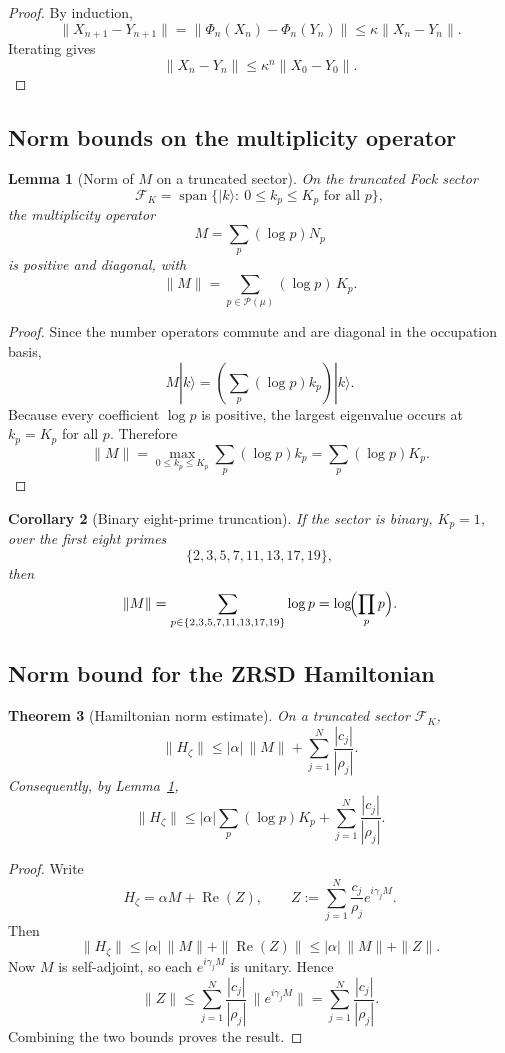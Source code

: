 \documentclass[11pt,a4paper]{article}
\theoremstyle{plain}
\newtheorem{theorem}{Theorem}[section]
\newtheorem{lemma}[theorem]{Lemma}
\newtheorem{corollary}[theorem]{Corollary}
\theoremstyle{definition}
\theoremstyle{remark}
\begin{document}
\begin{proof}
By induction,
\[
\|X_{n+1}-Y_{n+1}\|
=
\|\Phi_n(X_n)-\Phi_n(Y_n)\|
\le
\kappa \|X_n-Y_n\|.
\]
Iterating gives
\[
\|X_n-Y_n\|\le \kappa^n \|X_0-Y_0\|.
\]
\end{proof}

\subsection{Norm bounds on the multiplicity operator}

\begin{lemma}[Norm of \(M\) on a truncated sector]
\label{lem:M_bound}
On the truncated Fock sector
\[
\mathcal F_K
=
\operatorname{span}\{
|k\rangle:\ 0\le k_p\le K_p \text{ for all } p
\},
\]
the multiplicity operator
\[
M=\sum_p (\log p) N_p
\]
is positive and diagonal, with
\[
\|M\| = \sum_{p\in\mathcal P(\mu)} (\log p)\,K_p.
\]
\end{lemma}

\begin{proof}
Since the number operators commute and are diagonal in the occupation basis,
\[
M|k\rangle
=
\left(\sum_p (\log p)k_p\right)|k\rangle.
\]
Because every coefficient \(\log p\) is positive, the largest eigenvalue occurs at \(k_p=K_p\) for all \(p\). Therefore
\[
\|M\|
=
\max_{0\le k_p\le K_p}\sum_p (\log p)k_p
=
\sum_p (\log p)K_p.
\]
\end{proof}

\begin{corollary}[Binary eight-prime truncation]
If the sector is binary, \(K_p=1\), over the first eight primes
\[
\{2,3,5,7,11,13,17,19\},
\]
then
\[
\|M\| = \sum_{p\in\{2,3,5,7,11,13,17,19\}} \log p
=
\log\!\Bigl(\prod_{p} p\Bigr).
\]
\end{corollary}

\subsection{Norm bound for the ZRSD Hamiltonian}

\begin{theorem}[Hamiltonian norm estimate]
\label{thm:Hzeta_bound}
On a truncated sector \(\mathcal F_K\),
\[
\|H_\zeta\|
\le
|\alpha|\,\|M\|
+
\sum_{j=1}^N \frac{|c_j|}{|\rho_j|}.
\]
Consequently, by Lemma~\ref{lem:M_bound},
\[
\|H_\zeta\|
\le
|\alpha|
\sum_p (\log p)K_p
+
\sum_{j=1}^N \frac{|c_j|}{|\rho_j|}.
\]
\end{theorem}

\begin{proof}
Write
\[
H_\zeta
=
\alpha M + \operatorname{Re}(Z),
\qquad
Z:=\sum_{j=1}^N \frac{c_j}{\rho_j} e^{i\gamma_j M}.
\]
Then
\[
\|H_\zeta\|
\le
|\alpha|\,\|M\| + \|\operatorname{Re}(Z)\|
\le
|\alpha|\,\|M\| + \|Z\|.
\]
Now \(M\) is self-adjoint, so each \(e^{i\gamma_j M}\) is unitary. Hence
\[
\|Z\|
\le
\sum_{j=1}^N \frac{|c_j|}{|\rho_j|}\,\|e^{i\gamma_j M}\|
=
\sum_{j=1}^N \frac{|c_j|}{|\rho_j|}.
\]
Combining the two bounds proves the result.
\end{proof}
\end{document}
